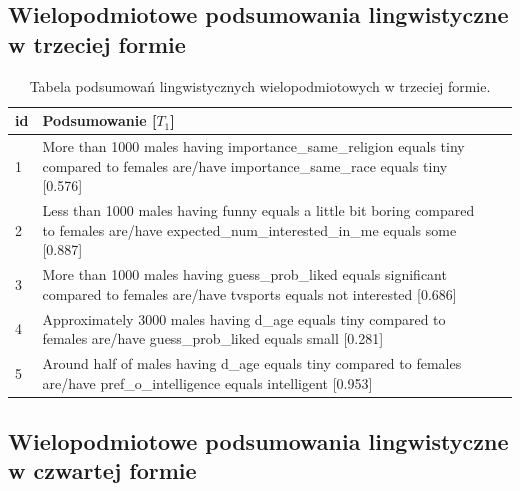 \documentclass{classrep}
\begin{document}
\subsection{Wielopodmiotowe podsumowania lingwistyczne w trzeciej formie}

\begin{center}
  \begin{table}[H]
    \begin{tabularx}{\textwidth}{lXc}
    
    id & Podsumowanie [$T_1$] \\ \hline 
  
    1 & More than 1000 males having importance\_same\_religion equals tiny compared to females are/have importance\_same\_race equals tiny [0.576] \\\hline
    2 & Less than 1000 males having funny equals a little bit boring compared to females are/have expected\_num\_interested\_in\_me equals some [0.887]\\  \hline
    3 & More than 1000 males having guess\_prob\_liked equals significant compared to females are/have tvsports equals not interested [0.686] \\ \hline
    4 & Approximately 3000 males having d\_age equals tiny compared to females are/have guess\_prob\_liked equals small [0.281] \\ \hline
    5 & Around half of males having d\_age equals tiny compared to females are/have pref\_o\_intelligence equals intelligent [0.953]\\ \hline
  \end{tabularx}
  \caption{Tabela podsumowań lingwistycznych wielopodmiotowych w trzeciej formie.}
\end{table}
\end{center}

\subsection{Wielopodmiotowe podsumowania lingwistyczne w czwartej formie}
\end{document}
